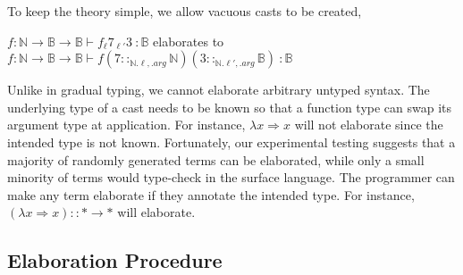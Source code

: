 To keep the theory simple, we allow vacuous casts to be created,
\begin{example}
$f:\mathbb{N}\rightarrow\mathbb{B}\rightarrow\mathbb{B}\vdash f_{\ell}7_{\ell'}3\ :\mathbb{B}$ elaborates to $f:\mathbb{N}\rightarrow\mathbb{B}\rightarrow\mathbb{B}\vdash f\left(7::_{\mathbb{N}.\ell,.arg}\mathbb{N}\right)\left(3::_{\mathbb{N}.\ell',.arg}\mathbb{B}\right)\ :\mathbb{B}$
\end{example}


Unlike in gradual typing, we cannot elaborate arbitrary untyped syntax.
The underlying type of a cast needs to be known so that a function type can swap its argument type at application.
For instance, $\lambda x\Rightarrow x$ will not elaborate since the intended type is not known.
Fortunately, our experimental testing suggests that a majority of randomly generated terms can be elaborated, while only a small minority of terms would type-check in the surface language.
The programmer can make any term elaborate if they annotate the intended type.
For instance, $\left(\lambda x\Rightarrow x\right)::*\rightarrow*$ will elaborate.

\subsection{Elaboration Procedure}

